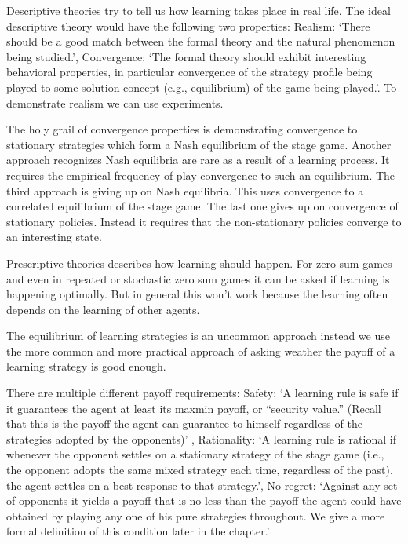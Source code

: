 \documentclass{article}
\begin{document}
Descriptive theories try to tell us how learning takes place
in real life.
The ideal descriptive theory would have the following two properties:
Realism: `There should be a good match between the formal theory and the
natural phenomenon being studied.', Convergence: `The formal
theory should exhibit interesting behavioral properties, in particular
convergence of the strategy profile being played to some solution concept
(e.g., equilibrium) of the game being played.'.
To demonstrate realism we can use experiments.

The holy grail of convergence properties is demonstrating convergence to
stationary strategies which form a Nash equilibrium of the stage game.
Another approach recognizes Nash equilibria are rare as a result
of a learning process. It requires the empirical frequency of
play convergence to such an equilibrium.
The third approach is giving up on Nash equilibria. This uses
convergence to a correlated equilibrium of the stage game.
The last one gives up on convergence of stationary policies. Instead it
requires that the non-stationary policies converge to an interesting state.

Prescriptive theories describes how learning should happen.
For zero-sum games and even in repeated or stochastic
zero sum games it can be asked if learning is happening optimally.
But in general this won't work because the learning often depends on the
learning of other agents.

The equilibrium of learning strategies is an uncommon approach
instead we use the more common and more practical approach
of asking weather the payoff of a learning strategy is good enough.

There are multiple different payoff requirements:
Safety: `A learning rule is safe if it guarantees the agent at least
its maxmin payoff, or “security value.” (Recall that this is the payoff the agent
can guarantee to himself regardless of the strategies adopted by the opponents)'
, Rationality: `A learning rule is rational if whenever the opponent
settles on a stationary strategy of the stage game (i.e., the opponent adopts the
same mixed strategy each time, regardless of the past), the agent settles on a best
response to that strategy.', No-regret: `Against any set of opponents it yields a payoff that is no less than the
payoff the agent could have obtained by playing any one of his pure strategies
throughout. We give a more formal definition of this condition later in the chapter.'
\end{document}
